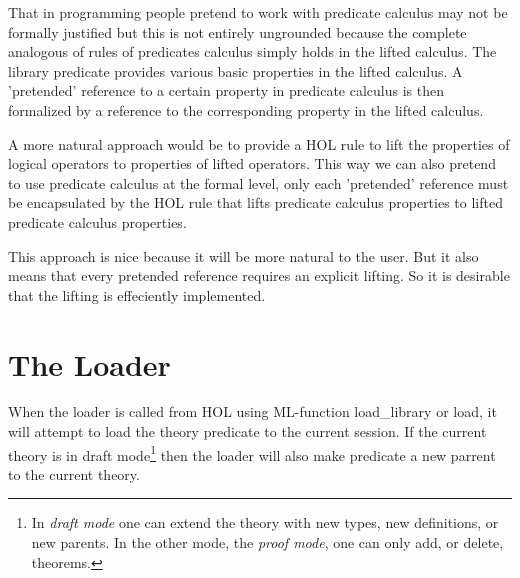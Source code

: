 That in programming people pretend to work with predicate calculus may
not be formally justified but this is not entirely ungrounded because
the complete analogous of rules of predicates calculus simply holds in
the lifted calculus. The library \code{}predicate\edoc{} provides various basic
properties in the lifted calculus. A 'pretended' reference to a
certain property in predicate calculus is then formalized by a
reference to the corresponding property in the lifted calculus.

A more natural approach would be to provide a HOL rule to lift the
properties of logical operators to properties of lifted operators.
This way we can also pretend to use predicate calculus at the formal
level, only each 'pretended' reference must be encapsulated by the HOL
rule that lifts predicate calculus properties to lifted predicate
calculus properties.

This approach is nice because it will be more natural to the user. But
it also means that every pretended reference requires an explicit
lifting. So it is desirable that the lifting is effeciently
implemented. 



\appendix
\chapter{The Loader}
\label{loader}

When the loader is called from HOL using ML-function \code{}load_library\edoc{}
or \code{}load\edoc{}, it will attempt to load the theory \code{}predicate\edoc{} to the
current session. If the current theory is in draft mode\footnote{In
{\em draft mode} one can extend the theory with new types, new
definitions, or new parents. In the other mode, the {\em proof mode},
one can only add, or delete, theorems.} then the loader will also make
\code{}predicate\edoc{} a new parrent to the current theory.

